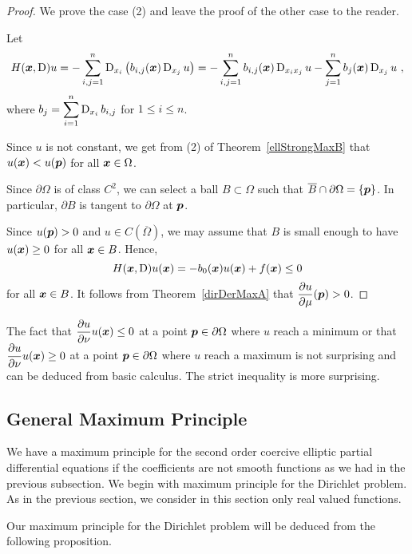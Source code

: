 \begin{proof}
We prove the case (2) and leave the proof of the other case to the reader.

Let
\[
H({\bm{x}},\operatorname{D})u = - \sum_{i,j=1}^n
\operatorname{D}_{x_i} \left( b_{i,j}({\bm{x}}) \operatorname{D}_{x_j} u \right)
= - \sum_{i,j=1}^n b_{i,j}({\bm{x}}) \operatorname{D}_{x_i x_j} u
- \sum_{j=1}^n b_j({\bm{x}}) \operatorname{D}_{x_j} u \ ,
\]
where $\displaystyle b_j = \sum_{i=1}^n \operatorname{D}_{x_i} b_{i,j}$ for
$1 \leq i \leq n$.

Since $u$ is not constant, we get from (2) of Theorem~\ref{ellStrongMaxB}
that $u({\bm{x}}) < u({\bm{p}})$ for all ${\bm{x}} \in \Omega$.

Since $\partial \Omega$ is of class $\displaystyle C^2$, we can select a ball
$B \subset \Omega$ such that $\overline{B} \cap \partial \Omega = \{{\bm{p}}\}$.
In particular, $\partial B$ is tangent to $\partial \Omega$ at ${\bm{p}}$.

Since $u({\bm{p}}) > 0$ and $u \in C(\overline{\Omega})$, we may assume
that $B$ is small enough to have $u({\bm{x}}) \geq 0$ for all
${\bm{x}} \in B$.  Hence,
\[
H({\bm{x}},\operatorname{D}) u({\bm{x}}) = -b_0({\bm{x}}) u({\bm{x}}) + f({\bm{x}}) \leq 0
\]
for all ${\bm{x}} \in B$.  It follows from Theorem~\ref{dirDerMaxA}
that $\displaystyle \frac{\partial{u}}{\partial \mu}({\bm{p}}) > 0$.
\end{proof}

The fact that $\displaystyle \frac{\partial{u}}{\partial \nu} u({\bm{x}}) \leq 0$ 
at a point ${\bm{p}} \in \partial \Omega$ where $u$ reach a minimum or
that $\displaystyle \frac{\partial{u}}{\partial \nu} u({\bm{x}}) \geq 0$ 
at a point ${\bm{p}} \in \partial \Omega$ where $u$ reach a maximum is
not surprising and can be deduced from basic calculus.  The strict
inequality is more surprising.

\subsection{General Maximum Principle}

We have a maximum principle for the second order coercive elliptic
partial differential equations if the coefficients are not smooth
functions as we had in the previous subsection.  We begin with maximum
principle for the Dirichlet problem.  As in the previous section, we
consider in this section only real valued functions.

Our maximum principle for the Dirichlet problem will be deduced from
the following proposition.

